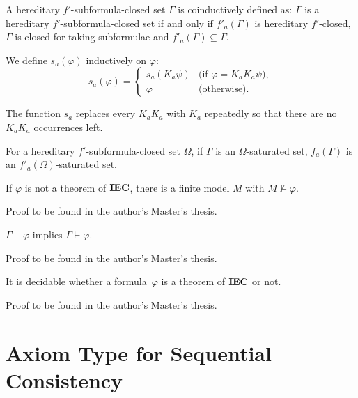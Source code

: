   \begin{definition}
   A hereditary $f'$-subformula-closed set $\Gamma$ is coinductively defined as:
   $\Gamma$ is a hereditary $f'$-subformula-closed set if and only
   if $f'_a(\Gamma)$ is hereditary $f'$-closed, $\Gamma$ is closed for taking subformulae and
   $f'_a(\Gamma)\subseteq \Gamma$.
  \end{definition}

  \begin{definition}
   We define $s_a(\varphi)$ inductively on $\varphi$:
   \[
   s_a(\varphi) = \begin{cases}
		   s_a(K_a\psi) & \text{(if $\varphi = K_aK_a\psi$)},\\
		   \varphi & \text{(otherwise)}.
		  \end{cases}
   \]
  \end{definition}
  \noindent The function $s_a$ replaces every $K_aK_a$ with $K_a$ repeatedly so that there are no
  $K_aK_a$ occurrences left.

  \begin{lemma}
   \label{fpreserve}
   For a hereditary $f'$-subformula-closed set $\Omega$,
   if $\Gamma$ is an $\Omega$-saturated set,
   $f_a(\Gamma)$ is an $f'_a(\Omega)$-saturated set.
  \end{lemma}

  \newcommand{\natpls}{{\mathbb N}^{+}}

\begin{theorem}
 \label{fmp}
 If $\varphi$ is not a theorem of ${\rm {\textbf{IEC}}}$,
 there is a finite model $M$ with $M\not\models\varphi$.
\end{theorem}
Proof to be found in the author's Master's thesis.

\begin{theorem}
 \label{strong-completeness}
 $\Gamma\models\varphi$ implies $\Gamma\vdash\varphi$.
\end{theorem}
Proof to be found in the author's Master's thesis.

\begin{theorem}
 \label{decidability}
 It is decidable whether a formula~$\varphi$ is a theorem of ${\rm {\textbf{IEC}}}$ or not.
\end{theorem}
Proof to be found in the author's Master's thesis.

  \section{Axiom Type for Sequential Consistency}
  \label{sc}

